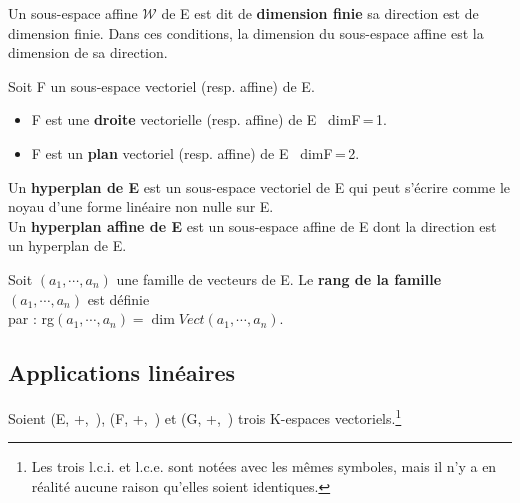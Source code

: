 \vspace{.3cm}

Un sous-espace affine \(\mathcal{W}\) de E est dit de \textbf{dimension finie} \ssi sa direction est de dimension finie. Dans ces conditions, la dimension du sous-espace affine est la dimension de sa direction.

\vspace{1.4cm}

\noindent Soit F un sous-espace vectoriel (resp. affine) de E.\vspace{-0.1cm}
\begin{itemize}[leftmargin=1cm, label=•]
    \item F est une \textbf{droite} vectorielle (resp. affine) de E \ssi \, dimF\,=\,1.

    \item F est un \textbf{plan} vectoriel (resp. affine) de E \ssi\, dimF\,=\,2.
\end{itemize}

\vspace{1.6cm}

Un \textbf{hyperplan de E} est un sous-espace vectoriel de E qui peut s'écrire comme le noyau d'une forme linéaire non nulle sur E.\\
Un \textbf{hyperplan affine de E} est un sous-espace affine de E dont la direction est un hyperplan de E.

\vspace{2.1cm}

Soit \((a_1,\cdots,a_n)\) une famille de vecteurs de E. Le \textbf{rang de la famille} \((a_1,\cdots,a_n)\) est définie\\
par : rg\((a_1,\cdots,a_n)=\dim Vect(a_1,\cdots,a_n)\).\vspace{0.5cm}

\newpage

\subsection{Applications linéaires}

\vspace{0.3cm}

\begin{center}
    Soient (E, +,\ \lce), (F, +,\ \lce) et (G, +,\ \lce) trois K-espaces vectoriels.\footnote{Les trois l.c.i. et l.c.e. sont notées avec les mêmes symboles, mais il n'y a en réalité aucune raison qu'elles soient identiques.}
\end{center}


